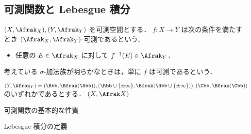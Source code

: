 \subsection{可測関数と Lebesgue 積分}

\begin{definition}
    $(X,\Afrak_X),(Y,\Afrak_Y)$ を可測空間とする．
    $f:X\to Y$ は次の条件を満たすとき $(\Afrak_X,\Afrak_Y)$-可測であるという．
    \begin{itemize}
        \item 任意の $E\in\Afrak_X$ に対して $f^{-1}(E)\in\Afrak_Y$．
    \end{itemize}
    考えている $\sigma$-加法族が明らかなときは，単に $f$ は可測であるという．

    $(Y,\Afrak_Y)=(\Rbb,\Bfrak(\Rbb)),(\Rbb\cup\{\pm\infty\},\Bfrak(\Rbb\cup\{\pm\infty\})),(\Cbb,\Bfrak(\Cbb))$
    のいずれかであるとする．
    $(X,\Afrak X)$
\end{definition}

\begin{proposition}
    可測関数の基本的な性質
\end{proposition}

\begin{definition}
    Lebesgue 積分の定義
\end{definition}
